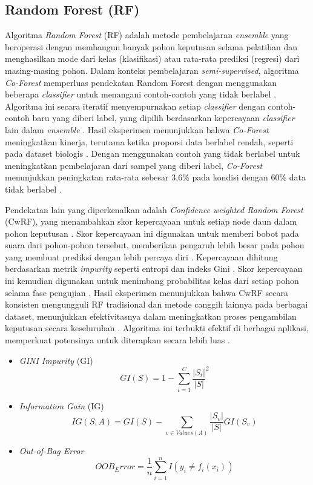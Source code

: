 \documentclass[conference]{IEEEtran}
\begin{document}
\subsection{Random Forest (RF)}

Algoritma \textit{Random Forest} (RF) adalah metode pembelajaran \textit{ensemble} yang beroperasi dengan membangun banyak pohon keputusan selama pelatihan dan menghasilkan mode dari kelas (klasifikasi) 
atau rata-rata prediksi (regresi) dari masing-masing pohon. Dalam konteks pembelajaran \textit{semi-supervised}, algoritma \textit{Co-Forest} memperluas pendekatan Random Forest dengan menggunakan 
beberapa \textit{classifier} untuk menangani contoh-contoh yang tidak berlabel \cite{b23}. Algoritma ini secara iteratif menyempurnakan setiap \textit{classifier} dengan contoh-contoh baru yang diberi label, 
yang dipilih berdasarkan kepercayaan \textit{classifier} lain dalam \textit{ensemble} \cite{b23}. Hasil eksperimen menunjukkan bahwa \textit{Co-Forest} meningkatkan kinerja, terutama ketika proporsi data berlabel rendah, 
seperti pada dataset biologis \cite{b23}. Dengan menggunakan contoh yang tidak berlabel untuk meningkatkan pembelajaran dari sampel yang diberi label, \textit{Co-Forest} menunjukkan peningkatan 
rata-rata sebesar 3,6\% pada kondisi dengan 60\% data tidak berlabel \cite{b23}.

Pendekatan lain yang diperkenalkan adalah \textit{Confidence weighted Random Forest} (CwRF), yang menambahkan skor kepercayaan untuk setiap node daun dalam pohon keputusan \cite{b24}. Skor kepercayaan ini digunakan 
untuk memberi bobot pada suara dari pohon-pohon tersebut, memberikan pengaruh lebih besar pada pohon yang membuat prediksi dengan lebih percaya diri \cite{b24}. Kepercayaan dihitung berdasarkan metrik \textit{impurity} 
seperti entropi dan indeks Gini \cite{b24}. Skor kepercayaan ini kemudian digunakan untuk menimbang probabilitas kelas dari setiap pohon selama fase pengujian \cite{b24}. Hasil eksperimen menunjukkan bahwa CwRF secara konsisten 
mengungguli RF tradisional dan metode canggih lainnya pada berbagai dataset, menunjukkan efektivitasnya dalam meningkatkan proses pengambilan keputusan secara keseluruhan \cite{b24}. Algoritma ini terbukti efektif 
di berbagai aplikasi, memperkuat potensinya untuk diterapkan secara lebih luas \cite{b24}.

\begin{itemize}
    \item \textit{GINI Impurity} (GI)
        \begin{equation}
            GI(S) = 1 - \sum_{i=1}^C \frac{|S_i|} {|S|}^2
        \end{equation}
    \item \textit{Information Gain} (IG)
        \begin{equation}
            IG(S, A) = GI(S) - \sum_{v \in Values(A)} \frac{|S_v|} {|S|} GI(S_v)
        \end{equation}
    \item \textit{Out-of-Bag Error}
        \begin{equation}
            OOB_Error = \frac{1}{n} \sum_{i=1}^n I(y_i \neq f_i(x_i))
        \end{equation}
\end{itemize}
\end{document}
